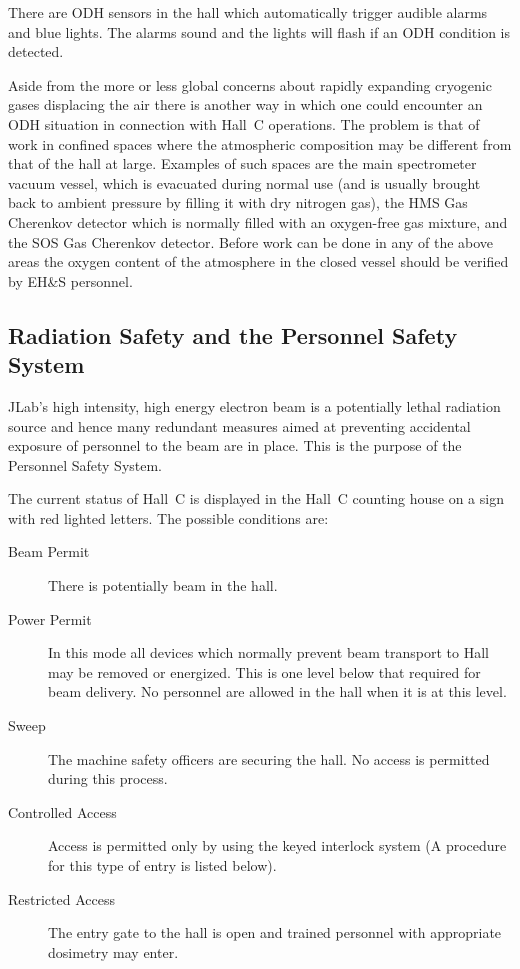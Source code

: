 {There are ODH sensors in the hall which automatically trigger audible
alarms and blue lights. The alarms sound and the lights will flash if
an ODH condition is detected.

Aside from the more or less global concerns about rapidly expanding
cryogenic gases displacing the air there is another
way in which one could encounter an ODH situation in connection with Hall~C
operations. The problem is that of work in confined spaces where
the atmospheric composition may be different from that of the hall at
large. Examples of such spaces are the main spectrometer vacuum vessel,
which is evacuated during normal use (and is usually brought back to ambient
pressure by filling it with dry nitrogen gas), the HMS Gas Cherenkov detector
which is normally filled with an oxygen-free gas mixture, and the
SOS Gas Cherenkov detector. Before work can be done in any of the
above areas the oxygen content of the atmosphere in the closed vessel should
be verified by EH\&S personnel.

\subsection{Radiation Safety and the Personnel Safety System }

JLab's high intensity, high energy electron beam is a potentially lethal
radiation source and hence many redundant measures
aimed at preventing accidental exposure of personnel to the beam are in place.
This is the purpose of the Personnel Safety System.

The current status of Hall~C is displayed in the Hall~C counting house
on a sign with red lighted letters. The possible conditions are:
\begin{description}
\item[Beam Permit] There is potentially beam in the hall.
\item[Power Permit] In this mode all devices which normally prevent beam 
transport to Hall may be removed or energized.  This is one level below 
that required for beam delivery.
No personnel are allowed in the hall when it is at this level.
\item[Sweep] The machine safety officers are securing the hall.
No access is permitted during this process.
\item[Controlled Access] Access is permitted only by using the keyed
interlock system (A procedure for this type of entry is listed below).
\item[Restricted Access] The entry gate to the hall is open and trained
personnel with appropriate dosimetry may enter.
\end{description}

}
